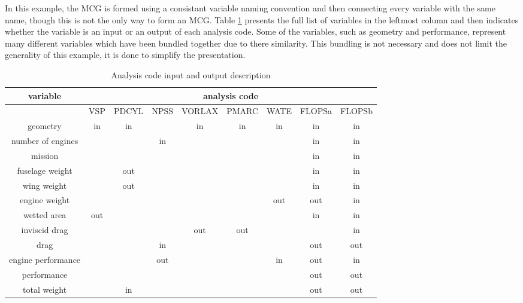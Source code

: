 	In this example, the MCG is formed using a consistant variable naming convention and then connecting every variable with the same name, though this is not the only way to form an MCG. 
	Table \ref{t:ins and outs} presents the full list of variables in the leftmost column and then indicates whether the variable is an input or an output of each analysis code. 
	Some of the variables, such as geometry and performance, represent many different variables which have been bundled together due to there similarity. 
	This bundling is not necessary and does not limit the generality of this example, it is done to simplify the presentation.
	\begin{table}[htb!]
	  \centering
	  \caption{Analysis code input and output description}
		\begin{tabular}{ccccccccc}
		\toprule
		variable & \multicolumn{8}{c}{analysis code} \\
		\midrule
			  & VSP   & PDCYL & NPSS  & VORLAX & PMARC & WATE  & FLOPSa & FLOPSb \\
		geometry & in    & in    &       & in    & in    & in    & in    & in \\
		number of engines &       &       & in    &       &       &       & in    & in \\
		mission &       &       &       &       &       &       & in    & in \\
		fuselage weight &       & out   &       &       &       &       & in    & in \\
		wing weight &       & out   &       &       &       &       & in    & in \\
		engine weight &       &       &       &       &       & out   & out   & in \\
		wetted area & out   &       &       &       &       &       & in    & in \\
		inviscid drag &       &       &       & out   & out   &       &       & in \\
		drag  &       &       & in    &       &       &       & out   & out \\
		engine performance &       &       & out   &       &       & in    & out   & in \\
		performance &       &       &       &       &       &       & out   & out \\
		total weight &       & in    &       &       &       &       & out   & out \\
		\bottomrule
		\end{tabular}
	  \label{t:ins and outs}
	\end{table}

